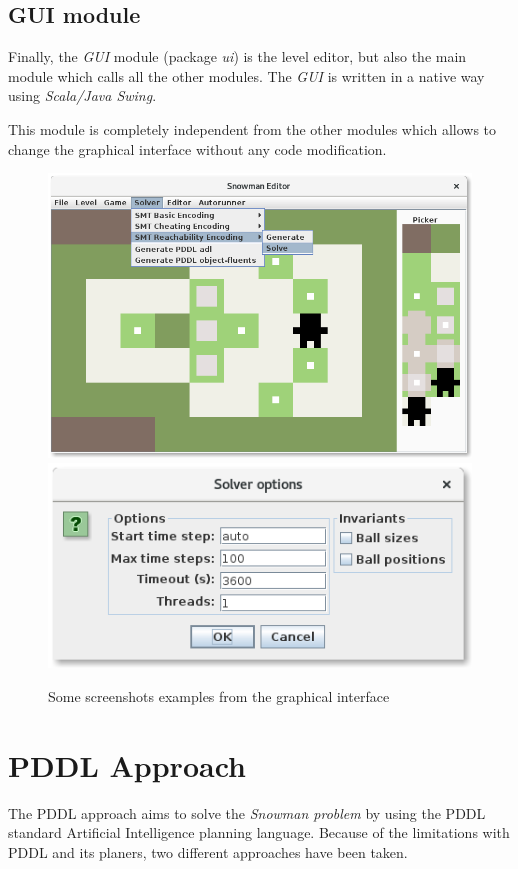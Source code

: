 \documentclass{report}
\theoremstyle{plain}
\begin{document}
\subsection{GUI module}
Finally, the \emph{GUI} module (package \emph{ui}) is the level editor, but also the main module which calls all the other modules. The \emph{GUI} is written in a native way using \emph{Scala/Java Swing}.

This module is completely independent from the other modules which allows to change the graphical interface without any code modification.

\begin{figure}
    \begin{center}
    \includegraphics[scale=0.3,valign=t]{gui-module-1.png}
    \includegraphics[scale=0.3,valign=t]{gui-module-2.png}
    \end{center}
    \caption{Some screenshots examples from the graphical interface}
    \label{fig:gui-module}
\end{figure}

\section{PDDL Approach}
The PDDL approach aims to solve the \emph{Snowman problem} by using the PDDL standard Artificial Intelligence planning language. Because of the limitations with PDDL and its planers, two different approaches have been taken. 
\end{document}
